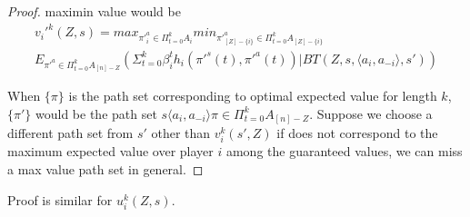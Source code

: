 \begin{proof}
	maximin value would be \\
	\begin{equation}
	\begin{split}
	v_i'^{k}(Z,s) = 
	max_{\pi'^{a}_{i} \in \Pi_{t=0}^{k} A_{i}}
	min_{\pi'^{a}_{[Z]-\{i\}} \in \Pi_{t=0}^{k} A_{[Z]-\{i\}}}\\
	E_{\pi'^{a} \in \Pi_{t=0}^{k} A_{[n]-Z}}(\Sigma_{t=0}^{k} \beta_i^{t}h_{i}(\pi'^{s}(t),\pi'^{a}(t))|BT(Z,s,\langle a_i,a_{-i} \rangle,s'))
	\end{split}	
	\end{equation}
	
	
	When $\{\pi\}$ is the path set corresponding to optimal expected value for length $k$,   $\{\pi'\}$ would be the path set $s\langle a_i,a_{-i}\rangle \pi \in \Pi_{t=0}^{k} A_{[n]-Z}$. Suppose we choose a different path set from $s'$ other than $v_i^k(s',Z)$ if does not correspond to the maximum expected value over player $i$ among the guaranteed values, we can miss a max value path set in general. 
\end{proof}

Proof is similar for $u_i^k(Z,s)$.

